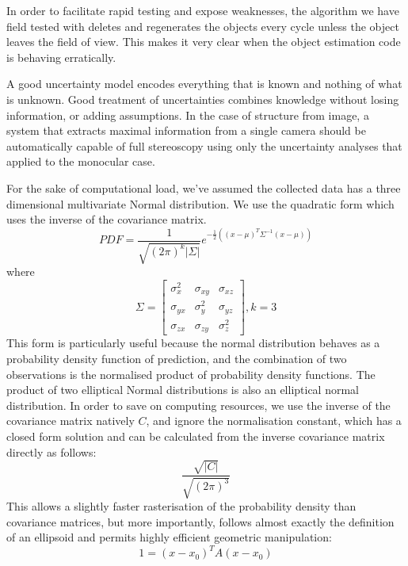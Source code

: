 \documentclass{article}
\newcounter{subsubsubsection}[subsubsection]
\begin{document}
        In order to facilitate rapid testing and expose weaknesses, the algorithm we have field tested with deletes and regenerates the objects every cycle unless the object leaves the field of view.  This makes it very clear when the object estimation code is behaving erratically.
        \label{sec:UncertaintyAnalysis}

        A good uncertainty model encodes everything that is known and nothing of what is unknown.  Good treatment of uncertainties combines knowledge without losing information, or adding assumptions.
        In the case of structure from image, a system that extracts maximal information from a single camera should be automatically capable of full stereoscopy using only the uncertainty analyses that applied to the monocular case.
      

        For the sake of computational load, we've assumed the collected data has a three dimensional multivariate Normal distribution.  We use the quadratic form which uses the inverse of the covariance matrix.
        \begin{equation}
        PDF = \frac{1}{\sqrt {(2\pi)^k|\Sigma|}} e^{-\frac{1}{2}\left( \left(x-\mu\right)^T \Sigma^{-1} \left(x-\mu\right) \right)}
        \end{equation}
        where
        \begin{equation}
        \Sigma=\begin{bmatrix}
          \sigma_x^2 & \sigma_{xy} & \sigma_{xz} \\[0.3em]
          \sigma_{yx} & \sigma_y^2 & \sigma_{yz} \\[0.3em]
          \sigma_{zx} & \sigma_{zy} & \sigma_z^2 
        \end{bmatrix}, k=3
        \end{equation}
        This form is particularly useful because the normal distribution behaves as a probability density function of prediction, and the combination of two observations is the normalised product of probability density functions.  The product of two elliptical Normal distributions is also an elliptical normal distribution.  
        In order to save on computing resources, we use the inverse of the covariance matrix natively \(C\), and ignore the normalisation constant, which has a closed form solution and can be calculated from the inverse covariance matrix directly as follows:
        \begin{equation}
        \frac{\sqrt{|C|}}{\sqrt{(2\pi)^3}}
        \end{equation}
        This allows a slightly faster rasterisation of the probability density than covariance matrices, but more importantly, follows almost exactly the definition of an ellipsoid and permits highly efficient geometric manipulation:
        \begin{equation}
        1 = \left(x-x_0\right)^T A \left(x-x_0\right)
        \end{equation}
\end{document}
